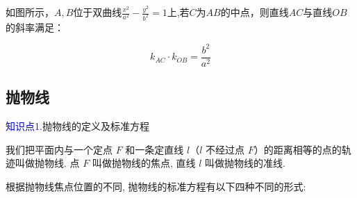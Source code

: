 \documentclass{article}
\begin{document}
\begin{tcolorbox}[colback=blue!10,colframe=blue!70!black,title=圆锥曲线的"垂"径定理]
\begin{center}
\begin{tikzpicture}[>=Stealth, scale=1.2]
\end{tikzpicture}
\end{center}

如图所示，$A,B$位于双曲线$\frac{x^2}{a^2}-\frac{y^2}{b^2}=1$上,若$C$为$AB$的中点，则直线$AC$与直线$OB$的斜率满足：

$$k_{AC} \cdot k_{OB}=\frac{b^2}{a^2}$$


\end{tcolorbox}

\newpage

\subsection{抛物线}
 \vspace{2\baselineskip}


\textcolor{blue}{知识点1.}抛物线的定义及标准方程
 \vspace{2\baselineskip}

我们把平面内与一个定点 $F$ 和一条定直线 $l$（$l$ 不经过点 $F$）的距离相等的点的轨迹叫做抛物线. 点 $F$ 叫做抛物线的焦点, 直线 $l$ 叫做抛物线的准线.

根据抛物线焦点位置的不同, 抛物线的标准方程有以下四种不同的形式:
 \vspace{1\baselineskip}
\end{document}
